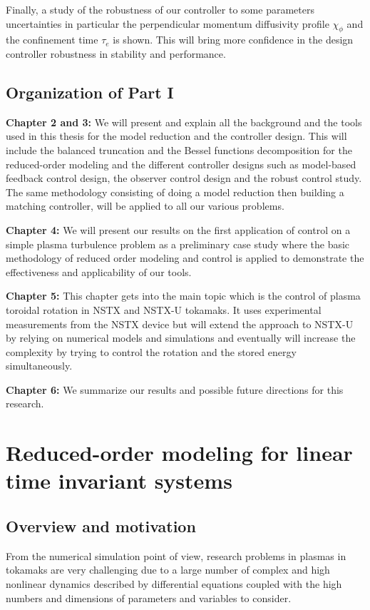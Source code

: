 \documentclass[12pt,lot, lof]{puthesis}
\begin{document}
Finally, a study of the robustness of our controller to some parameters uncertainties in particular the perpendicular momentum diffusivity profile $\chi_{\phi}$ and the confinement time $\tau_e$  is shown. This will bring more confidence in the design controller robustness in stability and performance.



\section{Organization of Part I}

{\bf{Chapter 2 and 3:}} We will present and explain all the background and  the tools used in this thesis for the model reduction and the controller design. This will include the balanced truncation and the Bessel functions decomposition for the reduced-order modeling and the different controller designs such as model-based feedback control design, the observer control design and the robust control study. The same methodology consisting of doing a model reduction then building a matching controller, will be applied to all our various problems.

{\bf{Chapter 4:}} We will present our results on the first application of control on a simple plasma turbulence problem as a preliminary case study where the basic methodology of reduced order modeling and control is applied to demonstrate the effectiveness and applicability of our tools.

{\bf{Chapter 5:}}  This chapter gets into the main topic which is the control of plasma toroidal rotation in NSTX  and NSTX-U tokamaks.
It uses experimental measurements from the NSTX device but will extend the approach to NSTX-U by relying on numerical models and  simulations and eventually will increase the complexity by trying to control the rotation and the stored energy simultaneously.

{\bf{Chapter 6:}} We summarize our results and possible future directions for this research.


\chapter{Reduced-order modeling for linear time invariant systems}
\label{chapitre2}

\section{Overview and motivation}
From the numerical simulation point of view, research problems in plasmas in tokamaks are very challenging due to a large number of complex and high nonlinear dynamics described by differential equations coupled with the high numbers and dimensions of parameters and variables to consider. 
\end{document}
